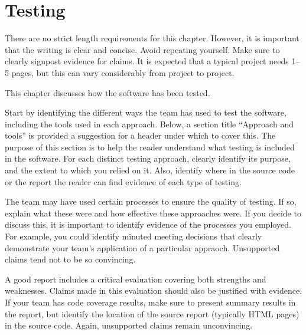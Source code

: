 \chapter{Testing}
\label{chap:testing}


\begin{length}
There are no strict length requirements for this chapter.  However, it is important that the writing is clear and concise.  Avoid repeating yourself.  Make sure to clearly signpost evidence for claims.  It is expected that a typical project needs 1--5 pages, but this can vary considerably from project to project.
\end{length}

\begin{expectations}
This chapter discusses how the software has been tested.  

Start by identifying the different ways the team has used to test the software, including the tools used in each approach.  Below, a section title ``Approach and tools'' is provided a suggestion for a header under which to cover this.  The purpose of this section is to help the reader understand what testing is included in the software.  For each distinct testing approach, clearly identify its purpose, and the extent to which you relied on it.  Also, identify where in the source code or the report the reader can find evidence of each type of testing.

The team may have used certain processes to ensure the quality of testing.  If so, explain what these were and how effective these approaches were.  If you decide to discuss this, it is important to identify evidence of the processes you employed.  For example, you could identify minuted meeting decisions that clearly demonstrate your team's application of a particular appraoch.  Unsupported claims tend not to be so convincing.

A good report includes a critical evaluation covering both strengths and weaknesses.  Claims made in this evaluation should also be justified with evidence.  If your team has code coverage results, make sure to present summary results in the report, but identify the location of the source report (typically HTML pages) in the source code.  Again, unsupported claims remain unconvincing.


\end{expectations}
